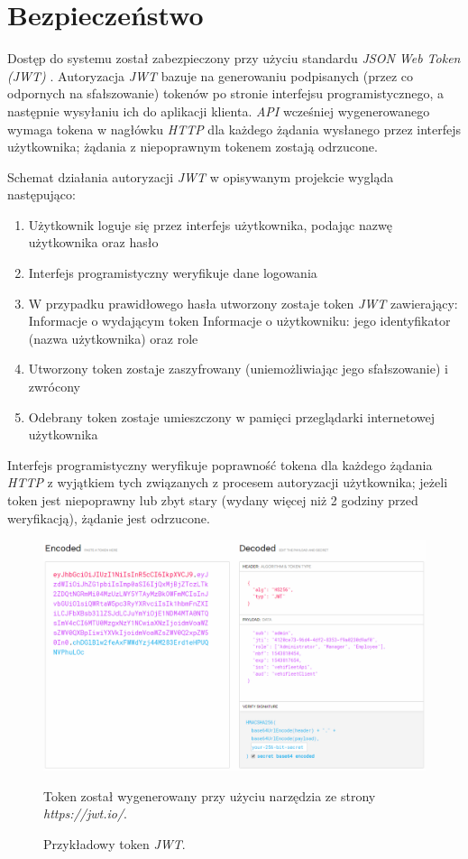 \documentclass[eng,printmode,openany]{mgr}
\begin{document}
	\newpage
	\section{Bezpieczeństwo}
	Dostęp do systemu został zabezpieczony przy użyciu standardu \textit{JSON Web Token (JWT)} \cite{jwt}. Autoryzacja \textit{JWT} bazuje na generowaniu podpisanych (przez co odpornych na sfałszowanie) tokenów po stronie interfejsu programistycznego, a następnie wysyłaniu ich do aplikacji klienta. \textit{API} wcześniej wygenerowanego wymaga tokena w nagłówku \textit{HTTP} dla każdego żądania wysłanego przez interfejs użytkownika; żądania z niepoprawnym tokenem zostają odrzucone.
	
	Schemat działania autoryzacji \textit{JWT} w opisywanym projekcie wygląda następująco:
	\begin{enumerate}
		\item Użytkownik loguje się przez interfejs użytkownika, podając nazwę użytkownika oraz hasło
		\item Interfejs programistyczny weryfikuje dane logowania
		\item W przypadku prawidłowego hasła utworzony zostaje token \textit{JWT} zawierający:
		\subitem Informacje o wydającym token
		\subitem Informacje o użytkowniku: jego identyfikator (nazwa użytkownika) oraz role
		\item Utworzony token zostaje zaszyfrowany (uniemożliwiając jego sfałszowanie) i zwrócony	
		\item Odebrany token zostaje umieszczony w pamięci przeglądarki internetowej użytkownika
	\end{enumerate}
	Interfejs programistyczny weryfikuje poprawność tokena dla każdego żądania \textit{HTTP} z wyjątkiem tych związanych z procesem autoryzacji użytkownika; jeżeli token jest niepoprawny lub zbyt stary (wydany więcej niż 2 godziny przed weryfikacją), żądanie jest odrzucone.
	
	\begin{figure}[H]
		\centering
		\includegraphics[width=\textwidth]{images/jwt.png}
		\caption{Przykładowy token \textit{JWT}.}
		\small 
		Token został wygenerowany przy użyciu narzędzia ze strony \textit{https://jwt.io/}.
	\end{figure}
	
\end{document}
